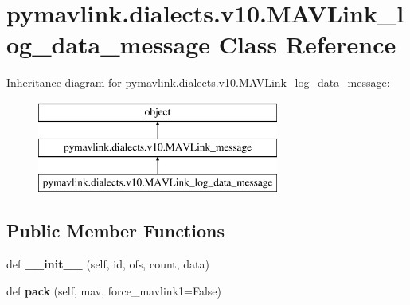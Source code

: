 \hypertarget{classpymavlink_1_1dialects_1_1v10_1_1MAVLink__log__data__message}{}\section{pymavlink.\+dialects.\+v10.\+M\+A\+V\+Link\+\_\+log\+\_\+data\+\_\+message Class Reference}
\label{classpymavlink_1_1dialects_1_1v10_1_1MAVLink__log__data__message}
Inheritance diagram for pymavlink.\+dialects.\+v10.\+M\+A\+V\+Link\+\_\+log\+\_\+data\+\_\+message\+:\begin{figure}[H]
\begin{center}
\leavevmode
\includegraphics[height=3.000000cm]{classpymavlink_1_1dialects_1_1v10_1_1MAVLink__log__data__message}
\end{center}
\end{figure}
\subsection*{Public Member Functions}
\begin{DoxyCompactItemize}
\item 
\mbox{\label{classpymavlink_1_1dialects_1_1v10_1_1MAVLink__log__data__message_ab4b89750fc483b26447c0f1ebb52056b}} 
def {\bfseries \+\_\+\+\_\+init\+\_\+\+\_\+} (self, id, ofs, count, data)
\item 
\mbox{\label{classpymavlink_1_1dialects_1_1v10_1_1MAVLink__log__data__message_a18ca312f820cd5c26ab667c83dca992e}} 
def {\bfseries pack} (self, mav, force\+\_\+mavlink1=False)
\end{DoxyCompactItemize}
